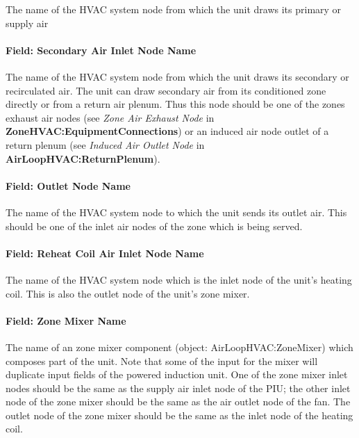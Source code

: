 The name of the HVAC system node from which the unit draws its primary or supply air

\paragraph{Field: Secondary Air Inlet Node Name}\label{field-secondary-air-inlet-node-name-1}

The name of the HVAC system node from which the unit draws its secondary or recirculated air. The unit can draw secondary air from its conditioned zone directly or from a return air plenum. Thus this node should be one of the zones exhaust air nodes (see \emph{Zone Air Exhaust Node} in \textbf{ZoneHVAC:EquipmentConnections}) or an induced air node outlet of a return plenum (see \emph{Induced Air Outlet Node} in \textbf{AirLoopHVAC:ReturnPlenum}).

\paragraph{Field: Outlet Node Name}\label{field-outlet-node-name-1}

The name of the HVAC system node to which the unit sends its outlet air. This should be one of the inlet air nodes of the zone which is being served.

\paragraph{Field: Reheat Coil Air Inlet Node Name}\label{field-reheat-coil-air-inlet-node-name-1}

The name of the HVAC system node which is the inlet node of the unit's heating coil. This is also the outlet node of the unit's zone mixer.

\paragraph{Field: Zone Mixer Name}\label{field-zone-mixer-name-1}

The name of an zone mixer component (object: AirLoopHVAC:ZoneMixer) which composes part of the unit. Note that some of the input for the mixer will duplicate input fields of the powered induction unit. One of the zone mixer inlet nodes should be the same as the supply air inlet node of the PIU; the other inlet node of the zone mixer should be the same as the air outlet node of the fan. The outlet node of the zone mixer should be the same as the inlet node of the heating coil.

